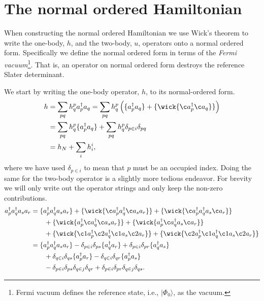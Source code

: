 \documentclass[
    a4paper, aps, twocolumn, floatfix, superscriptaddress,
    nofootinbib]{revtex4-1}
\newcommand{\1}{\mathds{1}}
\newcommand{\para}[1]{\left(#1\right)}
\newcommand{\ket}[1]{\rvert #1\rangle}
\newcommand{\acr}[1]{a_{#1}^{\dagger}}
\newcommand{\ade}[1]{a_{#1}}
\newcommand{\kslat}{\ket{\Phi_0}}
\begin{document}
\vfill
\newpage
\appendix
\section{The normal ordered Hamiltonian}
    When constructing the normal ordered Hamiltonian we use Wick's theorem to
    write the one-body, $h$, and the two-body, $u$, operators onto a normal
    ordered form. Specifically we define the normal ordered form in terms of the
    \emph{Fermi vacuum}\footnote{Fermi vacuum defines the reference state, i.e.,
    $\kslat$, as the vacuum.}. That is, an operator on normal ordered form
    destroys the reference Slater determinant.

    We start by writing the one-body operator, $h$, to its normal-ordered form.
    \begin{align}
        h &= \sum_{pq}h^p_q\acr{p}\ade{q}
        = \sum_{pq}h^p_q\para{
            \{\acr{p}\ade{q}\}
            + \{
                \wick{\c a_{p}^{\dagger} \c a_{q}}
            \}
        }
        \\
        &= \sum_{pq}h^p_q\{
            \acr{p}\ade{q}
        \}
        + \sum_{pq}h^p_q\delta_{p \in i}\delta_{pq}
        \\
        &= h_N + \sum_{i}h^i_i,
    \end{align}
    where we have used $\delta_{p \in i}$ to mean that $p$ must be an occupied
    index. Doing the same for the two-body operator is a slightly more tedious
    endeavor. For brevity we will only write out the operator strings and only
    keep the non-zero contributions.
    \begin{align}
        \acr{p}\acr{q}\ade{s}\ade{r}
        &=
        \{\acr{p}\acr{q}\ade{s}\ade{r}\}
        + \{
            \wick{\c a_p^{\dagger} a_{q}^{\dagger} \c a_{s} a_{r}}
        \}
        + \{
            \wick{\c a_p^{\dagger} a_{q}^{\dagger} a_{s} \c a_{r}}
        \}
        \nonumber \\
        &\qquad
        + \{
            \wick{a_p^{\dagger} \c a_{q}^{\dagger} \c a_{s} a_{r}}
        \}
        + \{
            \wick{a_p^{\dagger} \c a_{q}^{\dagger} a_{s} \c a_{r}}
        \}
        \nonumber \\
        &\qquad
        + \{
            \wick{\c1 a_p^{\dagger} \c2 a_{q}^{\dagger} \c1 a_{s} \c2 a_{r}}
        \}
        + \{
            \wick{\c2 a_p^{\dagger} \c1 a_{q}^{\dagger} \c1 a_{s} \c2 a_{r}}
        \}
        \\
        &=
        \{\acr{p}\acr{q}\ade{s}\ade{r}\}
        - \delta_{p \in i}\delta_{ps}\{\acr{q}\ade{r}\}
        + \delta_{p \in i}\delta_{pr}\{\acr{q}\ade{s}\}
        \nonumber \\
        &\qquad
        + \delta_{q \in i}\delta_{qs}\{\acr{p}\ade{r}\}
        - \delta_{q \in i}\delta_{qr}\{\acr{p}\ade{s}\}
        \nonumber \\
        &\qquad
        - \delta_{p \in i}\delta_{ps}\delta_{q \in j}\delta_{qr}
        + \delta_{p \in i}\delta_{pr}\delta_{q \in j}\delta_{qs}.
    \end{align}
\end{document}
